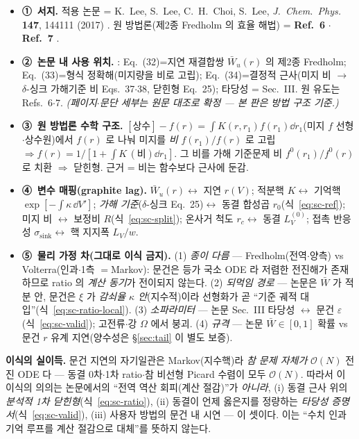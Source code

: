 \begin{itemize}[leftmargin=1.7em,itemsep=0.4em,label={}]
\item \textbf{①\ 서지.} 적용 논문 = K.~Lee, S.~Lee, C.~H.~Choi, S.~Lee, \emph{J.\ Chem.\ Phys.} \textbf{147}, 144111 (2017)
  \cite{lee2017jcp}. 원 방법론(제2종 Fredholm 의 효율 해법) = \textbf{Ref.~6} \cite{lee2011jcp}$\cdot$\textbf{Ref.~7} \cite{son2013jcp}.
\item \textbf{②\ 논문 내 사용 위치.} \cite{lee2017jcp}: Eq.~(32)=지연 재결합쌍 $\bar W_u(r)$ 의 제2종 Fredholm; Eq.~(33)=형식
  정확해(미지량을 비로 고립); Eq.~(34)=결정적 근사(미지 비 $\to$ $\delta$-싱크 가해기준 비 Eqs.~37$\cdot$38, 닫힌형
  Eq.~25); 타당성 = Sec.~III. 원 유도는 Refs.~6$\cdot$7. \emph{(페이지$\cdot$문단 세부는 원문 대조로 확정 --- 본 판은 방법
  구조 기준.)}
\item \textbf{③\ 원 방법론 수학 구조.} $[\text{상수}]-f(r)=\int K(r,r_1)f(r_1)\dd r_1$(미지 $f$ 선형$\cdot$상수원)에서
  $f(r)$ 로 나눠 미지를 \emph{비} $f(r_1)/f(r)$ 로 고립 $\Rightarrow f(r)=1/[1+\int K\,(\text{비})\dd r_1]$. 그 비를 가해
  기준문제 비 $f^0(r_1)/f^0(r)$ 로 치환 $\Rightarrow$ 닫힌형. 근거 = 비는 함수보다 근사에 둔감.
\item \textbf{④\ 변수 매핑(graphite lag).} $\bar W_u(r)\leftrightarrow$ 지연 $r(V)$; 적분핵 $K\leftrightarrow$ 기억핵
  $\exp[-\int\kappa\,\dd V']$; \emph{가해 기준}($\delta$-싱크 Eq.~25)$\leftrightarrow$ 동결 합성곱 $r_0$(식~\eqref{eq:sc-ref});
  미지 비 $\leftrightarrow$ 보정비 $R$(식~\eqref{eq:sc-split}); 온사거 척도 $r_c\leftrightarrow$ 동결 $L_V^{(0)}$; 접촉 반응성
  $\sigma_{\text{sink}}\leftrightarrow$ 핵 지지폭 $L_V/w$.
\item \textbf{⑤\ 물리 가정 차(그대로 이식 금지).} (1) \emph{종이 다름} --- Fredholm(전역$\cdot$양측) vs Volterra(인과$\cdot$1측
  $=$Markov): 문건은 등가 국소 ODE 라 저렴한 전진해가 존재하므로 ratio 의 \emph{계산 동기}가 전이되지 않는다. (2)
  \emph{되먹임 경로} --- 논문은 $\bar W$ 가 적분 안, 문건은 $\xi$ 가 \emph{감쇠율 $\kappa$ 안}(지수적)이라 선형화가 곧
  ``기준 궤적 대입''(식~\eqref{eq:sc-ratio-local}). (3) \emph{소파라미터} --- 논문 Sec.~III 타당성 $\leftrightarrow$ 문건
  $\varepsilon$(식~\eqref{eq:sc-valid}); 고전류$\cdot$강 $\Omega$ 에서 붕괴. (4) \emph{규격} --- 논문 $\bar W\in[0,1]$ 확률 vs
  문건 $r$ 유계 지연(양수성은 \S\ref{sec:tail} 이 별도 보증).
\end{itemize}

\begin{keybox}
\textbf{이식의 실이득.} 문건 지연의 자기일관은 Markov(지수핵)라 \emph{참 문제 자체가} $\mathcal O(N)$ 전진 ODE 다
--- 동결 0차$\cdot$1차 ratio$\cdot$참 비선형 Picard 수렴이 모두 $\mathcal O(N)$. 따라서 이 이식의 의의는 논문에서의
``전역 역산 회피(계산 절감)''가 \emph{아니라}, (i) 동결 근사 위의 \emph{분석적 1차 닫힌형}(식~\eqref{eq:sc-ratio}),
(ii) 동결이 언제 옳은지를 정량하는 \emph{타당성 증명서}(식~\eqref{eq:sc-valid}), (iii) 사용자 방법의 문건 내 시연 ---
이 셋이다. 이는 ``수치 인과기억 루프를 계산 절감으로 대체''를 뜻하지 않는다.
\end{keybox}

